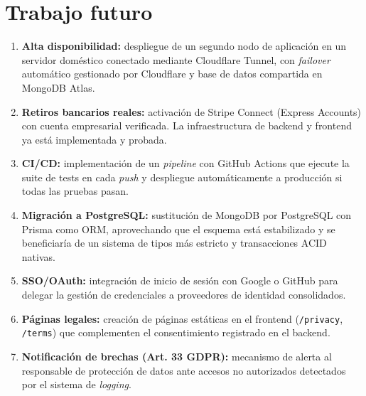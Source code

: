 \chapter{Trabajo futuro}\label{ch:futuro}

\begin{enumerate}
  \item \textbf{Alta disponibilidad:} despliegue de un segundo nodo de aplicación en un servidor doméstico conectado mediante Cloudflare Tunnel, con \emph{failover} automático gestionado por Cloudflare y base de datos compartida en MongoDB Atlas.

  \item \textbf{Retiros bancarios reales:} activación de Stripe Connect (Express Accounts) con cuenta empresarial verificada. La infraestructura de backend y frontend ya está implementada y probada.

  \item \textbf{CI/CD:} implementación de un \emph{pipeline} con GitHub Actions que ejecute la suite de tests en cada \emph{push} y despliegue automáticamente a producción si todas las pruebas pasan.

  \item \textbf{Migración a PostgreSQL:} sustitución de MongoDB por PostgreSQL con Prisma como ORM, aprovechando que el esquema está estabilizado y se beneficiaría de un sistema de tipos más estricto y transacciones ACID nativas.

  \item \textbf{SSO/OAuth:} integración de inicio de sesión con Google o GitHub para delegar la gestión de credenciales a proveedores de identidad consolidados.

  \item \textbf{Páginas legales:} creación de páginas estáticas en el frontend (\texttt{/privacy}, \texttt{/terms}) que complementen el consentimiento registrado en el backend.

  \item \textbf{Notificación de brechas (Art. 33 GDPR):} mecanismo de alerta al responsable de protección de datos ante accesos no autorizados detectados por el sistema de \emph{logging}.
\end{enumerate}

\printbibliography[heading=bibintoc,title={Bibliografía}]


